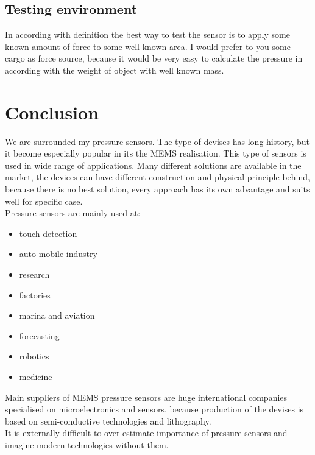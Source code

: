 \documentclass[english]{article}
\begin{document}
\subsection{Testing environment}

In according with definition the best way to test the sensor is to apply some known amount of force to some well known area. I would prefer to you some cargo as force source, because it would be very easy to calculate the pressure in according with the weight of object with well known mass. 

\section{Conclusion}

We are surrounded my pressure sensors. The type of devises has long history, but it become especially popular in its the MEMS realisation. This type of sensors is used in wide range of applications. Many different solutions are available in the market, the devices can have different construction and physical principle behind, because there is no best solution, every approach has its own advantage and suits well for specific case.\\

Pressure sensors are mainly used at:

\begin{itemize}
\item touch detection
\item auto-mobile industry
\item research
\item factories
\item marina and aviation
\item forecasting
\item robotics
\item medicine
\end{itemize}

Main suppliers of MEMS pressure sensors are huge international companies specialised on microelectronics and sensors, because production of the devises is based on semi-conductive technologies and lithography. \\

It is externally difficult to over estimate importance of pressure sensors and imagine modern technologies without them.

\newpage

\end{document}
